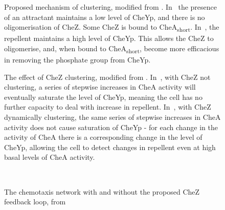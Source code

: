 \documentclass[../main.tex]{subfiles}
\begin{document}
\begin{figure}[p]
\begin{center}
\caption[Proposed mechanism of clustering]{Proposed mechanism of clustering, modified from \citet{lipkow06}. In~ the presence of an attractant maintains a low level of CheYp, and there is no oligomerisation of CheZ. Some CheZ is bound to CheA\textsubscript{short}. In~, the repellent maintains a high level of CheYp. This allows the CheZ to oligomerise, and, when bound to CheA\textsubscript{short}, become more efficacious in removing the phosphate group from CheYp.}
\label{fig:intro:chemo}
\end{center}
\end{figure}
\begin{figure}[p]
\begin{center}
\caption[Effect of CheZ clustering]{The effect of CheZ clustering, modified from \citet{lipkow06}. In~, with CheZ not clustering, a series of stepwise increases in CheA activity will eventually saturate the level of CheYp, meaning the cell has no further capacity to deal with increase in repellent. In~, with CheZ dynamically clustering, the same series of stepwise increases in CheA activity does not cause saturation of CheYp - for each change in the activity of CheA there is a corresponding change in the level of CheYp, allowing the cell to detect changes in repellent even at high basal levels of CheA activity.}
\label{fig:intro:chemo:clusternetwork}
\end{center}
\end{figure}

\begin{figure}
\begin{center}
\\
\caption[Modified chemotaxis network]{The chemotaxis network with and without the proposed CheZ feedback loop, from \citet{lipkowfigs}}
\label{fig:intro:netwok}
\end{center}
\end{figure}
\newpage
\end{document}
